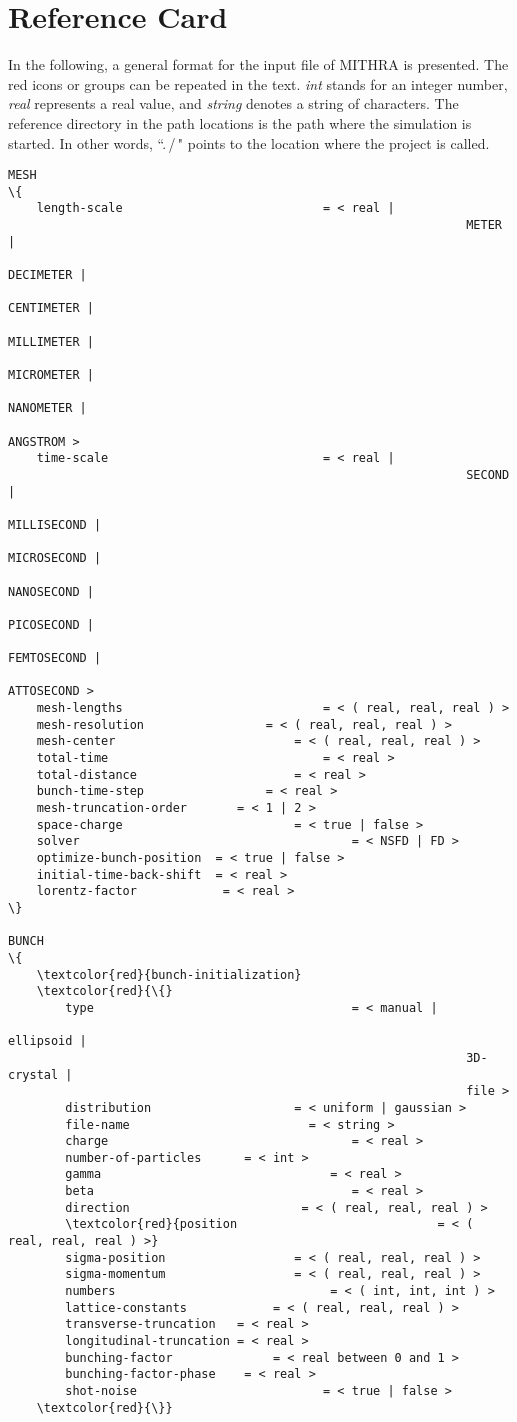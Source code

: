 \chapter{Reference Card}
\label{chapter_refcard}

In the following, a general format for the input file of MITHRA is presented. The red icons or groups can be repeated in the text. \emph{int} stands for an integer number, \emph{real} represents a real value, and \emph{string} denotes a string of characters. The reference directory in the path locations is the path where the simulation is started. In other words, ``.\,/\," points to the location where the project is called.

\begin{multicols}{2}
\setlength{\columnseprule}{0.1pt}

\begin{Verbatim}[fontsize=\footnotesize, tabsize=2, fontfamily=courier,	fontseries=b, commandchars=\\\{\}]
MESH
\{
	length-scale							= < real | 
																METER | 
																DECIMETER | 
																CENTIMETER | 
																MILLIMETER | 
																MICROMETER |
																NANOMETER | 
																ANGSTROM >
	time-scale								= < real | 
																SECOND | 
																MILLISECOND | 
																MICROSECOND | 
																NANOSECOND | 
																PICOSECOND | 
																FEMTOSECOND | 
																ATTOSECOND >
	mesh-lengths							= < ( real, real, real ) >
	mesh-resolution		 			= < ( real, real, real ) >
	mesh-center				 			= < ( real, real, real ) >
	total-time								= < real >
	total-distance						= < real >
	bunch-time-step		 			= < real >
	mesh-truncation-order 		= < 1 | 2 >
	space-charge  						= < true | false >
	solver										= < NSFD | FD >
	optimize-bunch-position	 = < true | false >
	initial-time-back-shift	 = < real >
	lorentz-factor            = < real >
\}

BUNCH
\{
	\textcolor{red}{bunch-initialization}
	\textcolor{red}{\{}
		type  									= < manual | 
																ellipsoid | 
																3D-crystal | 
																file >
		distribution  					= < uniform | gaussian >
		file-name 						  = < string >
		charge  								= < real >
		number-of-particles  	 = < int >
		gamma  								 = < real >
		beta  									= < real >
		direction  						 = < ( real, real, real ) >
		\textcolor{red}{position  							= < ( real, real, real ) >}
		sigma-position  				= < ( real, real, real ) >
		sigma-momentum  				= < ( real, real, real ) >
		numbers								 = < ( int, int, int ) >
		lattice-constants			 = < ( real, real, real ) >
		transverse-truncation   = < real >
		longitudinal-truncation = < real >
		bunching-factor  			 = < real between 0 and 1 >
		bunching-factor-phase	 = < real >
		shot-noise  						= < true | false >
	\textcolor{red}{\}}


\end{Verbatim}
\end{multicols}

